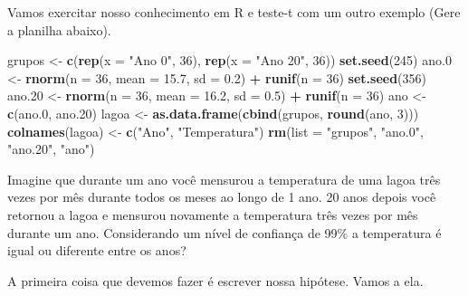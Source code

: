 \documentclass[]{book}
\newenvironment{Shaded}{\begin{snugshade}}{\end{snugshade}}
\newcommand{\DataTypeTok}[1]{\textcolor[rgb]{0.13,0.29,0.53}{#1}}
\newcommand{\DecValTok}[1]{\textcolor[rgb]{0.00,0.00,0.81}{#1}}
\newcommand{\FloatTok}[1]{\textcolor[rgb]{0.00,0.00,0.81}{#1}}
\newcommand{\KeywordTok}[1]{\textcolor[rgb]{0.13,0.29,0.53}{\textbf{#1}}}
\newcommand{\NormalTok}[1]{#1}
\newcommand{\OperatorTok}[1]{\textcolor[rgb]{0.81,0.36,0.00}{\textbf{#1}}}
\newcommand{\StringTok}[1]{\textcolor[rgb]{0.31,0.60,0.02}{#1}}
\begin{document}
Vamos exercitar nosso conhecimento em R e teste-t com um outro exemplo (Gere a planilha abaixo).

\begin{Shaded}
\begin{Highlighting}[]
\NormalTok{grupos <-}\StringTok{ }\KeywordTok{c}\NormalTok{(}\KeywordTok{rep}\NormalTok{(}\DataTypeTok{x =} \StringTok{"Ano 0"}\NormalTok{, }\DecValTok{36}\NormalTok{), }\KeywordTok{rep}\NormalTok{(}\DataTypeTok{x =} \StringTok{"Ano 20"}\NormalTok{, }\DecValTok{36}\NormalTok{))}
\KeywordTok{set.seed}\NormalTok{(}\DecValTok{245}\NormalTok{)}
\NormalTok{ano}\FloatTok{.0}\NormalTok{ <-}\StringTok{ }\KeywordTok{rnorm}\NormalTok{(}\DataTypeTok{n =} \DecValTok{36}\NormalTok{, }\DataTypeTok{mean =} \FloatTok{15.7}\NormalTok{, }\DataTypeTok{sd =} \FloatTok{0.2}\NormalTok{) }\OperatorTok{+}\StringTok{ }\KeywordTok{runif}\NormalTok{(}\DataTypeTok{n =} \DecValTok{36}\NormalTok{)}
\KeywordTok{set.seed}\NormalTok{(}\DecValTok{356}\NormalTok{)}
\NormalTok{ano}\FloatTok{.20}\NormalTok{ <-}\StringTok{ }\KeywordTok{rnorm}\NormalTok{(}\DataTypeTok{n =} \DecValTok{36}\NormalTok{, }\DataTypeTok{mean =} \FloatTok{16.2}\NormalTok{, }\DataTypeTok{sd =} \FloatTok{0.5}\NormalTok{) }\OperatorTok{+}\StringTok{ }\KeywordTok{runif}\NormalTok{(}\DataTypeTok{n =} \DecValTok{36}\NormalTok{)}
\NormalTok{ano <-}\StringTok{ }\KeywordTok{c}\NormalTok{(ano}\FloatTok{.0}\NormalTok{, ano}\FloatTok{.20}\NormalTok{)}
\NormalTok{lagoa <-}\StringTok{ }\KeywordTok{as.data.frame}\NormalTok{(}\KeywordTok{cbind}\NormalTok{(grupos, }\KeywordTok{round}\NormalTok{(ano, }\DecValTok{3}\NormalTok{)))}
\KeywordTok{colnames}\NormalTok{(lagoa) <-}\StringTok{ }\KeywordTok{c}\NormalTok{(}\StringTok{"Ano"}\NormalTok{, }\StringTok{"Temperatura"}\NormalTok{)}
\KeywordTok{rm}\NormalTok{(}\DataTypeTok{list =} \StringTok{"grupos"}\NormalTok{, }\StringTok{"ano.0"}\NormalTok{, }\StringTok{"ano.20"}\NormalTok{, }\StringTok{"ano"}\NormalTok{)}
\end{Highlighting}
\end{Shaded}

Imagine que durante um ano você mensurou a temperatura de uma lagoa três vezes por mês durante todos os meses ao longo de 1 ano. 20 anos depois você retornou a lagoa e mensurou novamente a temperatura três vezes por mês durante um ano. Considerando um nível de confiança de 99\% a temperatura é igual ou diferente entre os anos?

A primeira coisa que devemos fazer é escrever nossa hipótese. Vamos a ela.
\end{document}
